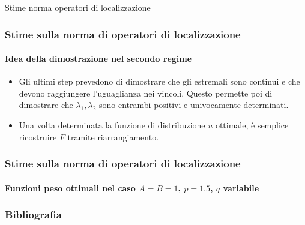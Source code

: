 \documentclass[aspectratio=141]{beamer}
\begin{document}
\begin{section}{Stime norma operatori di localizzazione}
	\begin{frame}
		\frametitle{Stime sulla norma di operatori di localizzazione}
		\framesubtitle{Idea della dimostrazione nel secondo regime}
		\begin{itemize}
			\item Gli ultimi step prevedono di dimostrare che gli estremali sono continui e che devono raggiungere l'uguaglianza nei vincoli. Questo permette poi di dimostrare che $\lambda_1, \lambda_2$ sono entrambi positivi e univocamente determinati.
			\pause
			\item Una volta determinata la funzione di distribuzione $u$ ottimale, è semplice ricostruire $F$ tramite riarrangiamento.
		\end{itemize}
	\end{frame}

	\begin{comment}
	\begin{frame}
		\frametitle{Stime sulla norma di operatori di localizzazione}
		\framesubtitle{Esempio di funzione ottimale nel secondo regime}
		\begin{columns}[onlytextwidth,T]
			\begin{column}{.45\linewidth}
				\begin{figure}
					\texttt{[image: ./Pictures/funzione\_distribuzione.jpg]}
				\end{figure}				
			\end{column}
			\begin{column}{.45\linewidth}
				\begin{figure}
					\texttt{[image: ./Pictures/funzione\_ottimale.jpg]}
				\end{figure}	
			\end{column}
		\end{columns}
		Esempio di funzione ottimale con $A=B=1$, $p=1.5$, $q = 20$. I corrispondenti moltiplicatori sono, approssimativamente, $\lambda_1 = 0.5144$ e $\lambda_2 = 0.1468$.
	\end{frame}
	\end{comment}

	\begin{frame}
		\frametitle{Stime sulla norma di operatori di localizzazione}
		\framesubtitle{Funzioni peso ottimali nel caso $A=B=1$, $p=1.5$, $q$ variabile}
		\vspace{-1.1cm}
		\begin{center}
			\vspace{1cm}
		\end{center}
	\end{frame}
	
\end{section}

\begin{frame}[allowframebreaks]
	\frametitle{Bibliografia}
	{\tiny
	\nocite{*}
	\printbibliography}
\end{frame}

\end{document}
